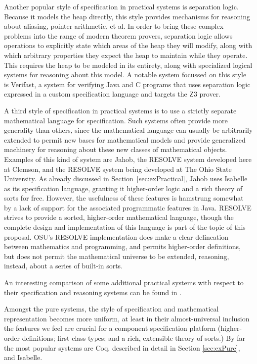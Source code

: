 Another popular style of specification in practical systems is separation logic\cite{reynoldsSeparationLogic}.  Because it models the heap directly, this style provides mechanisms for reasoning about aliasing, pointer arithmetic, et al.  In order to bring these complex problems into the range of modern theorem provers, separation logic allows operations to explicitly state which areas of the heap they will modify, along with which arbitrary properties they expect the heap to maintain while they operate.  This requires the heap to be modeled in its entirety, along with specialized logical systems for reasoning about this model.  A notable system focussed on this style is Verifast\cite{jacobsVerifast}, a system for verifying Java and C programs that uses separation logic expressed in a custom specification language and targets the Z3 prover.

A third style of specification in practical systems is to use a strictly separate mathematical language for specification.  Such systems often provide more generality than others, since the mathematical language can usually be arbitrarily extended to permit new bases for mathematical models and provide generalized machinery for reasoning about these new classes of mathematical objects.  Examples of this kind of system are Jahob, the RESOLVE system developed here at Clemson, and the RESOLVE system being developed at The Ohio State University.  As already discussed in Section~\ref{sec:exPractical}, Jahob uses Isabelle as its specification language, granting it higher-order logic and a rich theory of sorts for free.  However, the usefulness of these features is hamstrung somewhat by a lack of support for the associated programmatic features in Java.  RESOLVE strives to provide a sorted, higher-order mathematical language, though the complete design and implementation of this language is part of the topic of this proposal.  OSU's RESOLVE implementation does make a clear delineation between mathematics and programming, and permits higher-order definitions, but does not permit the mathematical universe to be extended, reasoning, instead, about a series of built-in sorts.

An interesting comparison of some additional practical systems with respect to their specification and reasoning systems can be found in \cite{bisl}.

Amongst the pure systems, the style of specification and mathematical representation becomes more uniform, at least in their almost-universal inclusion the features we feel are crucial for a component specification platform (higher-order definitions; first-class types; and a rich, extensible theory of sorts.)  By far the most popular systems are Coq, described in detail in Section \ref{sec:exPure}, and Isabelle.

